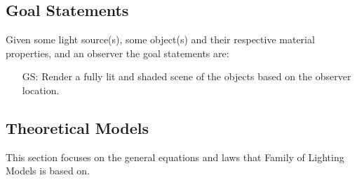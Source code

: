 \documentclass[12pt]{article}
\newcounter{goalnum} %
\newcommand{\famname}{Family of Lighting Models} %
\begin{document}
\subsection{Goal Statements}

\noindent Given some light source(s), some object(s) and their respective 
material properties, and an observer the goal statements are:

\begin{itemize}

\item[GS\refstepcounter{goalnum}\thegoalnum \label{gs-display}:] 
Render a fully lit and shaded scene of the objects based on the observer 
location.


\end{itemize}

\subsection{Theoretical Models} \label{sec_theoretical}

This section focuses on the general equations and laws that \famname{} is based
on.  %

~\newline
\end{document}
